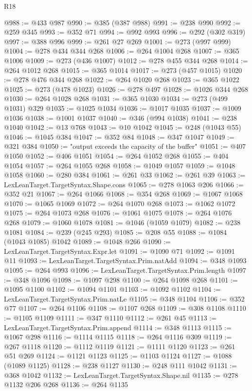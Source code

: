 \begin{lexlean}{R18}
\begin{coremodule}
{{{{{{{{{{{{{{{{{{{{{{{{{{{{{{{{{{{{{{{{{{{{{{{{{{{{{{{{{{{{{{{{{{{{{{{{{{{{{{{{{{{{{{{{{{{{{{{{{{{{{{{{{{{{{{{{{{{{{{{{{{{{{{{{{{{{{{{{{{{{{{{@988 := @433 @987
@990 := @385 (@387 @988)
@991 := @238 @990
@992 := @259 @345
@993 := @352 @71
@994 := @992 @993
@996 := @292 (@302 @319)
@997 := @388 @996
@999 := @261 @27 @269
@1001 := @273 (@997 @999)
@1004 := @278 @434 @344 @268
@1006 := @264 @1004 @268
@1007 := @365 @1006
@1009 := @273 (@436 @1007)
@1012 := @278 @455 @344 @268
@1014 := @264 @1012 @268
@1015 := @365 @1014
@1017 := @273 (@457 @1015)
@1020 := @278 @476 @344 @268
@1022 := @264 @1020 @268
@1023 := @365 @1022
@1025 := @273 (@478 @1023)
@1026 := @278 @497
@1028 := @1026 @344 @268
@1030 := @264 @1028 @268
@1031 := @365 @1030
@1034 := @273 (@499 @1031) @329
@1035 := @1025 @1034
@1036 := @1017 @1035
@1037 := @1009 @1036
@1038 := @1001 @1037
@1040 := @346 (@994 @1038)
@1041 := @238 @1040
@1042 := @13 @768
@1043 := @10 @1042
@1045 := @248 (@1043 @55)
@1046 := @1045 @384
@1047 := @352 @84
@1048 := @347 @1047
@1049 := @321 @384
@1050 := "output exceeds the capacity of the buffer"
@1051 := @407 @1050
@1052 := @406 @1051
@1054 := @264 @1052 @268
@1055 := @404 @1054
@1057 := @264 @1055 @268
@1058 := @1049 @1057
@1059 := @1048 @1058
@1060 := @280 @384
@1061 := @261 @33
@1062 := @261 @39
@1063 := LexLeanTarget.TargetSyntax.Shape.cons
@1065 := @278 @1063 @206
@1066 := @352 @21
@1067 := @264 @1066
@1068 := @354 @268
@1069 := @1067 @1068
@1070 := @1065 @1069
@1072 := @264 @1070 @268
@1073 := @1062 @1072
@1075 := @264 @1073 @268
@1076 := @1061 @1075
@1078 := @264 @1076 @268
@1079 := @1060 @1078
@1081 := @1046 (@1059 @1079)
@1082 := @238 @1081
@1084 := @239 (@245 @293)
@1085 := @208 @55
@1088 := @1084 (@1043 @1085) @1042
@1089 := @1048 @266
@1090 := LexLeanTarget.TargetSyntax.Expr.let
@1091 := @1090 @71
@1092 := @1091 @11
@1093 := LexLeanTarget.TargetSyntax.Prim.natAdd
@1094 := @348 @1093
@1095 := @264 @993
@1096 := LexLeanTarget.TargetSyntax.Prim.length
@1097 := @348 @1096
@1098 := @1097 @298
@1100 := @264 @1098 @268
@1101 := @1095 @1100
@1102 := @1094 @1101
@1103 := @1092 @1102
@1104 := LexLeanTarget.TargetSyntax.Prim.natLe
@1105 := @348 @1104
@1106 := @352 @77
@1107 := @264 @1106
@1108 := @1107 @268
@1109 := @308 @1108
@1110 := @1105 @1109
@1111 := @347 @1110
@1112 := @261 @45
@1113 := LexLeanTarget.TargetSyntax.Prim.append
@1114 := @348 @1113
@1115 := @1067 @298
@1116 := @1114 @1115
@1118 := @264 @1116 @309
@1119 := @267 @1118
@1120 := @1112 @1119
@1121 := @1111 @1120
@1123 := @261 @51 @269
@1124 := @1121 @1123
@1125 := @1103 @1124
@1127 := @1088 (@1089 @1125)
@1128 := @238 @1127
@1130 := @248 @111 @1042
@1131 := @368 @1042
@1132 := LexLeanTarget.TargetSyntax.Shape.nil
@1135 := @278 @1132 @206 @268
@1136 := @264 @1135
}}}}}}}}}}}}}}}}}}}}}}}}}}}}}}}}}}}}}}}}}}}}}}}}}}}}}}}}}}}}}}}}}}}}}}}}}}}}}}}}}}}}}}}}}}}}}}}}}}}}}}}}}}}}}}}}}}}}}}}}}}}}}}}}}}}}}}}}}}}}}}}
\end{coremodule}
\end{lexlean}
